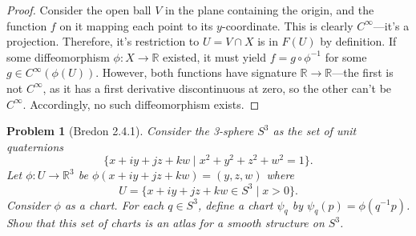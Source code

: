 \documentclass{article}
\newtheorem{plm}{Problem}
\begin{document}
\begin{proof}
  Consider the open ball $V$ in the plane containing the origin, and the function $f$ on it mapping each point to its $y$-coordinate.
  This is clearly $C^{\infty}$---it's a projection.
  Therefore, it's restriction to $U = V \cap X$ is in $F(U)$ by definition.
  If some diffeomorphism $\phi: X \to \mathbb{R}$ existed, it must yield $f = g \circ \phi^{-1}$ for some $g \in C^{\infty}(\phi(U))$.
  However, both functions have signature $\mathbb{R} \to \mathbb{R}$---the first is not $C^{\infty}$,
  as it has a first derivative discontinuous at zero, so the other can't be $C^{\infty}$.
  Accordingly, no such diffeomorphism exists.
\end{proof}

\begin{plm}[Bredon 2.4.1]
  Consider the 3-sphere $S^{3}$ as the set of unit quaternions
  \[
    \{x + iy + jz + kw \mid x^{2} + y^{2} + z^{2} + w^{2} = 1\}.
  \]
  Let $\phi: U \to \mathbb{R}^{3}$  be $\phi(x + iy + jz + kw) = (y, z, w)$ where
  \[
    U = \{x + iy + jz + kw \in S^{3} \mid x  > 0\}.
  \]
  Consider $\phi$ as a chart.
  For each $q \in S^{3}$, define a chart $\psi_{q}$ by $\psi_{q}(p) = \phi(q^{-1}p)$.
  Show that this set of charts is an atlas for a smooth structure on $S^{3}$.
\end{plm}
\end{document}
